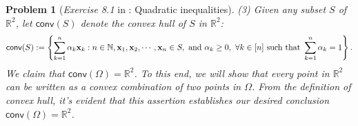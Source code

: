 \documentclass[11pt]{article}
\newtheorem{problem}{Problem}
\numberwithin{equation}{problem}
\begin{document}
\begin{problem} [\emph{Exercise 8.1} in \cite{calafiore2014optimization}: Quadratic inequalities]
{\indent (3) Given any subset $S$ of $\mathbb{R}^2$, let $\textsf{conv}(S)$ denote the convex hull of $S$ in $\mathbb{R}^2$:
\begin{equation*}
    \textsf{conv}(S) := \left\{ \sum_{k=1}^{n} \alpha_k \mathbf{x}_k : n \in \mathbb{N}, \mathbf{x}_1, \mathbf{x}_2, \cdots, \mathbf{x}_n \in S, \textnormal{ and } \alpha_k \geq 0,\ \forall k \in [n] \textnormal{ such that } \sum_{k=1}^{n} \alpha_k = 1 \right\}.
\end{equation*}
We claim that $\textsf{conv}(\Omega) = \mathbb{R}^2$. To this end, we will show that every point in $\mathbb{R}^2$ can be written as a convex combination of two points in $\Omega$. From the definition of convex hull, it's evident that this assertion establishes our desired conclusion $\textsf{conv}(\Omega) = \mathbb{R}^2$.
\medskip

}
\end{problem}
\end{document}
